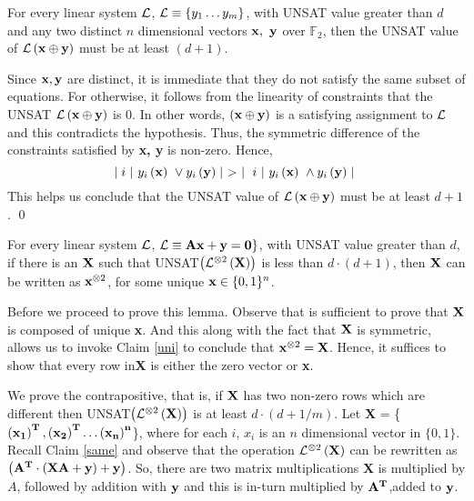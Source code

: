 {\begin{lemma}\label{unique}
  For every linear system ${\cal L}$, ${\cal L} \equiv \{y_1 \ldots y_m\}$, with
  UNSAT value greater than $d$ and any two distinct $n$ dimensional
  vectors ${\bf x},\ {\bf y}$ over $\mathbb{F}_2$, then the UNSAT
  value of ${\cal L}\left({\bf x} \oplus {\bf y}\right)$ must be at least
  $(d+ 1)$.
\end{lemma}
 Since ${\bf x, y}$ are distinct, it is
immediate that they do not satisfy the same subset of equations.  For
otherwise, it follows from the linearity of constraints that the UNSAT
${\cal L}\left({\bf x} \oplus {\bf y}\right)$ is $0$.  In other words,
$\left({\bf x} \oplus {\bf y}\right)$ is a satisfying assignment to
${\cal L}$ and this contradicts the hypothesis. Thus, the symmetric
difference of the constraints satisfied by {\bf x, y} is
non-zero. Hence,
\[
      \mid i\ \vert \ y_i\left({\bf x}\right) \ \vee y_i\left({\bf y}\right) \mid \ > \ \mid \ i \ \vert \  y_i\left({\bf x}\right) \ \wedge y_i\left({\bf y}\right) \mid \\
\]
This helps us conclude that the UNSAT value of ${\cal L}\left({\bf x}
  \oplus {\bf y}\right)$ must be at least ${d+ 1}$. \qed


\begin{lemma}\label{decode1}
  For every linear system ${\cal L}$, ${\cal L} \equiv {\bf Ax + y} = {\bf
    0}\}$, with UNSAT value greater than $d$, if there is an ${\bf X}$
  such that UNSAT$\left({\cal L}^{\otimes 2}\left({\bf X}\right)\right)$ is
  less than $d \cdot (d+1)$, then ${\bf X}$ can be written
  as ${\bf x}^{\otimes 2}$, for some unique ${\bf x} \in \{0,1\}^n$.
\end{lemma}
 Before we proceed to prove this lemma. Observe
that is sufficient to prove that ${\bf X}$ is composed of unique {\bf
  x}. And this along with the fact that ${\bf X}$ is symmetric, allows
us to invoke Claim \ref{uni} to conclude that ${\bf x}^{\otimes 2} =
{\bf X}$. Hence, it suffices to show that every row in{\bf X} is
either the zero vector or {\bf x}.

We prove the contrapositive, that is, if ${\bf X}$ has two non-zero rows which
are different then UNSAT$\left({\cal L}^{\otimes 2}\left({\bf
      X}\right)\right)$ is at least $d \cdot \left(d +
  1/m\right)$. Let {\bf X} = \Big\{${\bf \left(x_1\right)^T,
  \left(x_2\right)^T \ldots \left(x_n\right)^n}$\Big\}, where for each
$i$, $x_i$ is an $n$ dimensional vector in $\{0,1\}$. Recall Claim
\ref{same} and observe that the operation ${\cal L}^{\otimes 2}\left({\bf
    X} \right)$ can be rewritten as $\left({\bf A^T} \cdot \left({\bf
      X A} + {\bf y}\right) + {\bf y} \right)$. So, there are two
matrix multiplications {\bf X} is multiplied by $A$, followed by
addition with ${\bf y}$ and this is in-turn multiplied by ${\bf
  A^T}$,added to ${\bf y}$.

}
